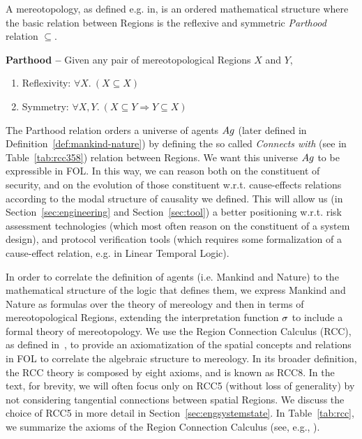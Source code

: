 A mereotopology, as defined e.g. in\autocite{Rachavelpula2017mereotopology},
is an ordered mathematical structure where the basic relation between Regions is the
reflexive and symmetric 
\emph{Parthood} relation $\subseteq$. 
\begin{definition}{\bf Parthood --}\label{def:parthood}
Given any pair of mereotopological Regions $X$ and $Y$,
	\begin{enumerate}[noitemsep]
		\item Reflexivity: $\forall X.~ (X\subseteq X)$
		\item Symmetry: $\forall X, Y.~ (X\subseteq Y \Rightarrow Y\subseteq X)$
	\end{enumerate}
\end{definition}

The Parthood relation orders a universe of agents $Ag$ (later defined in
Definition~\ref{def:mankind-nature}) by defining the so called
\emph{Connects with} (see in Table~\ref{tab:rcc358}) relation between Regions.
We want this universe $Ag$ to be expressible in FOL. In this way,
we can reason both on the constituent of security, and on the evolution of
those constituent w.r.t. cause-effects relations according to the modal
structure of causality we defined.  This will allow us (in
Section~\ref{sec:engineering} and Section~\ref{sec:tool}) a
better positioning w.r.t. risk
assessment technologies (which most often reason on the constituent of a system
design), and protocol verification tools (which requires some formalization of
a cause-effect relation, e.g.  in Linear Temporal Logic).

In order to correlate the definition of
agents (i.e. Mankind and Nature) to the
mathematical structure of the logic that defines them, we express Mankind and
Nature as formulas over the theory of mereology and then in terms of
mereotopological Regions, extending the interpretation function
$\sigma$ to include a formal theory of mereotopology.  We use the
Region Connection Calculus (RCC), as defined
in~\cite{bennettLogics,improvingRCC}, to provide an axiomatization of the
spatial concepts and relations in FOL to correlate the algebraic
structure to mereology. In its broader definition, the RCC theory is composed
by eight axioms, and is known as RCC8. In the text, for brevity, 
we will often focus only on RCC5 (without
loss of generality) by not considering tangential connections between spatial
Regions. We discuss the choice of RCC5 in more detail in
Section~\ref{sec:engsystemstate}. In Table~\ref{tab:rcc}, we
summarize the axioms of the Region Connection Calculus (see, e.g., \autocite{Grutter2008rcc}).

